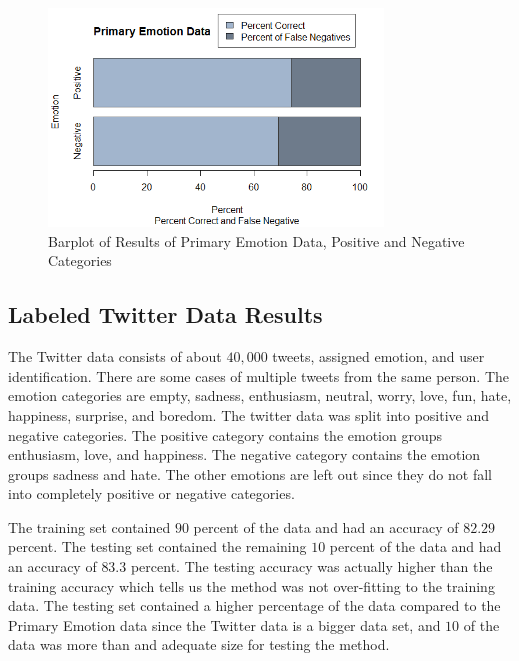 \documentclass[titlepage,letterpaper]{article}
\begin{document}
\begin{figure}[h!]
	\center
	\includegraphics[width = 3.5in]{BarPlotPrimaryResults.png}
	\caption{Barplot of Results of Primary Emotion Data, Positive and Negative Categories}
	\label{bpprimem}
\end{figure}


\subsection{Labeled Twitter Data Results}

The Twitter data consists of about $40,000$ tweets, assigned emotion, and user identification. There are some cases of multiple tweets from the same person. The emotion categories are empty, sadness, enthusiasm, neutral, worry, love, fun, hate, happiness, surprise, and boredom. The twitter data was split into positive and negative categories. The positive category contains the emotion groups enthusiasm, love, and happiness. The negative category contains the emotion groups sadness and hate. The other emotions are left out since they do not fall into completely positive or negative categories. 

The training set contained $90$ percent of the data and had an accuracy of $82.29$ percent. The testing set contained the remaining $10$ percent of the data and had an accuracy of $83.3$ percent. The testing accuracy was actually higher than the training accuracy which tells us the method was not over-fitting to the training data. The testing set contained a higher percentage of the data compared to the Primary Emotion data since the Twitter data is a bigger data set, and $10$ of the data was more than and adequate size for testing the method. 
\end{document}
